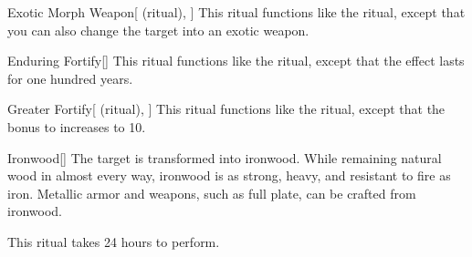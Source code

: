 \lowercase{\hypertarget{spell:Exotic Morph Weapon}{}}\label{spell:Exotic Morph Weapon}
\begin{attuneability}[Rank 3]{\hypertarget{spell:Exotic Morph Weapon}{Exotic Morph Weapon}}[ (ritual), ]
This ritual functions like the  ritual, except that you can also change the target into an exotic weapon.
\end{attuneability}
\vspace{0.25em}



\lowercase{\hypertarget{spell:Enduring Fortify}{}}\label{spell:Enduring Fortify}
\begin{apability}[Rank 4]{\hypertarget{spell:Enduring Fortify}{Enduring Fortify}}[]
This ritual functions like the  ritual, except that the effect lasts for one hundred years.
\end{apability}
\vspace{0.25em}



\lowercase{\hypertarget{spell:Greater Fortify}{}}\label{spell:Greater Fortify}
\begin{attuneability}[Rank 4]{\hypertarget{spell:Greater Fortify}{Greater Fortify}}[ (ritual), ]
This ritual functions like the  ritual, except that the bonus to  increases to 10.
\end{attuneability}
\vspace{0.25em}



\lowercase{\hypertarget{spell:Ironwood}{}}\label{spell:Ironwood}
\begin{apability}[Rank 4]{\hypertarget{spell:Ironwood}{Ironwood}}[]
The target is transformed into ironwood.
While remaining natural wood in almost every way, ironwood is as strong, heavy, and resistant to fire as iron.
Metallic armor and weapons, such as full plate, can be crafted from ironwood.

This ritual takes 24 hours to perform.
\end{apability}
\vspace{0.25em}




